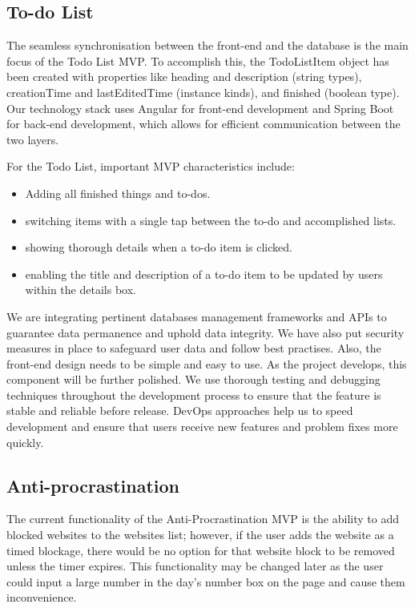 \documentclass[a4paper]{article}
\begin{document}
{\subsection{To-do List}

The seamless synchronisation between the front-end and the database is the main focus of the Todo List MVP. To accomplish this, the TodoListItem object has been created with properties like heading and description (string types), creationTime and lastEditedTime (instance kinds), and finished (boolean type). Our technology stack uses Angular for front-end development and Spring Boot for back-end development, which allows for efficient communication between the two layers.

For the Todo List, important MVP characteristics include:

\begin{itemize}[itemsep=0.5\itemsep, parsep=0\parsep]
	\item Adding all finished things and to-dos.
	\item switching items with a single tap between the to-do and accomplished lists.
	\item showing thorough details when a to-do item is clicked.
	\item enabling the title and description of a to-do item to be updated by users within the details box.
\end{itemize}

We are integrating pertinent databases management frameworks and APIs to guarantee data permanence and uphold data integrity. We have also put security measures in place to safeguard user data and follow best practises.
Also, the front-end design needs to be simple and easy to use. As the project develops, this component will be further polished.
We use thorough testing and debugging techniques throughout the development process to ensure that the feature is stable and reliable before release. DevOps approaches help us to speed development and ensure that users receive new features and problem fixes more quickly.


\subsection{Anti-procrastination}

The current functionality of the Anti-Procrastination MVP is the ability to add blocked websites to the websites list; however, if the user adds the website as a timed blockage, there would be no option for that website block to be removed unless the timer expires. This functionality may be changed later as the user could input a large number in the day's number box on the page and cause them inconvenience.

}
\end{document}
